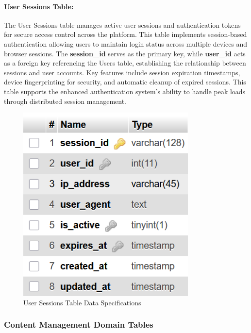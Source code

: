 \documentclass[12pt,a4paper,oneside]{book}
\begin{document}
\clearpage
\paragraph{User Sessions Table:}
The User Sessions table manages active user sessions and authentication tokens for secure access control across the platform. This table implements session-based authentication allowing users to maintain login status across multiple devices and browser sessions. The \textbf{session\_id} serves as the primary key, while \textbf{user\_id} acts as a foreign key referencing the Users table, establishing the relationship between sessions and user accounts. Key features include session expiration timestamps, device fingerprinting for security, and automatic cleanup of expired sessions. This table supports the enhanced authentication system's ability to handle peak loads through distributed session management.

\begin{figure}[H]
\centering
\includegraphics[width=0.8\textwidth]{assets/DBTable/Table4.3.png}
\caption{User Sessions Table Data Specifications}
\label{table:user_sessions}
\end{figure}

\clearpage
\subsubsection{Content Management Domain Tables}
\end{document}
